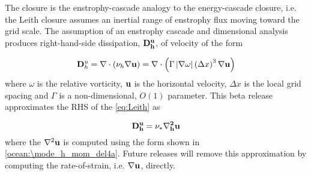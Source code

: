 The \cite{Leith:1996wu} closure is the enstrophy-cascade analogy to the \cite{Smagorinsky:1963wc} energy-cascade closure, i.e.  the Leith closure assumes an inertial range of enstrophy flux moving toward the grid scale. The assumption of an enstrophy cascade and dimensional analysis produces right-hand-side dissipation, $\bf{D}^u_h$, of velocity of the form

\begin{equation}
\label{eq:\mode_Leith}
{\bf D}^u_h =\nabla \cdot \left( \nu_h \nabla {\bf u} \right) = \nabla \cdot \left( \Gamma \left| \nabla \omega  \right| \left( \Delta x \right)^3 \nabla \bf{u} \right)
\end{equation}
where $\omega$ is the relative vorticity, ${\bf u}$ is the horizontal velocity, $\Delta x$ is the local grid spacing and $\Gamma$ is a non-dimensional, $O(1)$ parameter. This beta release approximates the RHS of the \ref{eq:Leith} as

\begin{equation}
\bf{D}^u_h=\nu_\ast \nabla_h^2 {\bf u}
\end{equation}
where the $\nabla^2 {\bf u}$ is computed using the form shown in \ref{ocean:\mode_h_mom_del4a}. Future releases will remove this approximation by computing the rate-of-strain, i.e. $\nabla {\bf u}$, directly.
